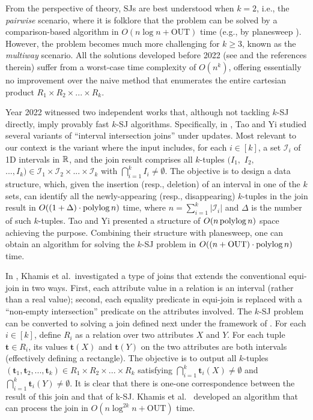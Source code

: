 \documentclass[sigconf]{acmart}
\def\vgap{\vspace{0mm}}
\def\I{\mathcal{I}}
\def\out{\mathrm{OUT}}
\begin{document}
\vgap

From the perspective of theory, SJs are best understood when $k = 2$, i.e., the {\em pairwise} scenario, where it is folklore that the problem can be solved by a comparison-based algorithm in $O(n \log n + \out)$ time (e.g., by planesweep \cite{bcko08}). However, the problem becomes much more challenging for $k \ge 3$, known as the {\em multiway} scenario. All the solutions developed  before 2022 (see \cite{gcn+13,mp98,mp01,pmt99} and the references therein) suffer from a worst-case time complexity of $O(n^k)$, offering essentially no improvement over the naive method that enumerates the entire cartesian product $R_1 \times R_2 \times ... \times R_k$.

\vgap

Year 2022 witnessed two independent works \cite{ty22,kcko22} that, although not tackling $k$-SJ directly, imply provably fast $k$-SJ algorithms. Specifically, in \cite{ty22}, Tao and Yi studied several variants of ``interval intersection joins'' under updates. Most relevant to our context is the variant where the input includes, for each $i \in [k]$, a set $\I_i$ of 1D intervals in $\mathbb{R}$, and the join result comprises all $k$-tuples $(I_1,$ $I_2,$ $..., I_k) \in \I_1 \times \I_2 \times ... \times \I_k$ with $\bigcap_{i=1}^k I_i \neq \emptyset$. The objective is to design a data structure, which, given the insertion (resp., deletion) of an interval in one of the $k$ sets, can identify all the newly-appearing (resp., disappearing) $k$-tuples in the join result in $O((1+\Delta) \cdot \operatorname*{polylog} n)$ time, where $n = \sum_{i=1}^k |\I_i|$ and $\Delta$ is the number of such $k$-tuples. Tao and Yi \cite{ty22} presented a structure of $O(n \operatorname*{polylog} n)$ space achieving the purpose. Combining their structure with planesweep, one can obtain an algorithm for solving the $k$-SJ problem in $O((n + \out) \cdot \polylog n)$ time.

\vgap

In \cite{kcko22}, Khamis et al.\ investigated a type of joins that extends the conventional equi-join in two ways. First, each attribute value in a relation is an interval (rather than a real value); second, each equality predicate in equi-join is replaced with a ``non-empty intersection'' predicate on the attributes involved. The $k$-SJ problem can be converted to solving a join defined next under the framework of \cite{kcko22}. For each $i \in [k]$, define $R_i$ as a relation over two attributes $X$ and $Y$. For each tuple $\bm{t} \in R_i$, its values $\bm{t}(X)$ and $\bm{t}(Y)$ on the two attributes are both intervals (effectively defining a rectangle). The objective is to output all $k$-tuples $(\bm{t}_1, \bm{t}_2, ..., \bm{t}_k) \in R_1 \times R_2 \times ... \times R_k$ satisfying $\bigcap_{i=1}^k \bm{t}_i(X) \ne \emptyset$ and $\bigcap_{i=1}^k \bm{t}_i(Y) \ne \emptyset$. It is clear that there is one-one correspondence between the result of this join and that of k-SJ. Khamis et al.\ \cite{kcko22} developed an algorithm that can process the join  in $O(n \log^{2k} n + \out)$ time.
\end{document}

